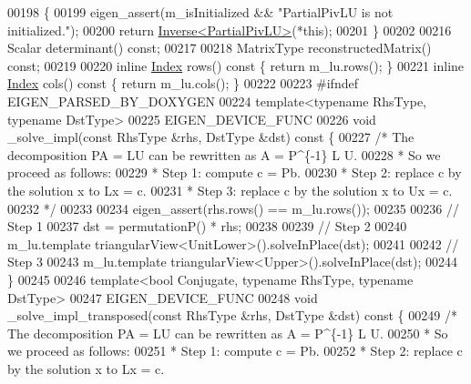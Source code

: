 \begin{DoxyCode}
00198 \textcolor{keyword}{    }\{
00199       eigen\_assert(m\_isInitialized && \textcolor{stringliteral}{"PartialPivLU is not initialized."});
00200       \textcolor{keywordflow}{return} \hyperlink{class_eigen_1_1_inverse}{Inverse<PartialPivLU>}(*this);
00201     \}
00202 
00216     Scalar determinant() \textcolor{keyword}{const};
00217 
00218     MatrixType reconstructedMatrix() \textcolor{keyword}{const};
00219 
00220     \textcolor{keyword}{inline} \hyperlink{group___core___module_a554f30542cc2316add4b1ea0a492ff02}{Index} rows()\textcolor{keyword}{ const }\{ \textcolor{keywordflow}{return} m\_lu.rows(); \}
00221     \textcolor{keyword}{inline} \hyperlink{group___core___module_a554f30542cc2316add4b1ea0a492ff02}{Index} cols()\textcolor{keyword}{ const }\{ \textcolor{keywordflow}{return} m\_lu.cols(); \}
00222 
00223 \textcolor{preprocessor}{    #ifndef EIGEN\_PARSED\_BY\_DOXYGEN}
00224     \textcolor{keyword}{template}<\textcolor{keyword}{typename} RhsType, \textcolor{keyword}{typename} DstType>
00225     EIGEN\_DEVICE\_FUNC
00226     \textcolor{keywordtype}{void} \_solve\_impl(\textcolor{keyword}{const} RhsType &rhs, DstType &dst)\textcolor{keyword}{ const }\{
00227      \textcolor{comment}{/* The decomposition PA = LU can be rewritten as A = P^\{-1\} L U.}
00228 \textcolor{comment}{      * So we proceed as follows:}
00229 \textcolor{comment}{      * Step 1: compute c = Pb.}
00230 \textcolor{comment}{      * Step 2: replace c by the solution x to Lx = c.}
00231 \textcolor{comment}{      * Step 3: replace c by the solution x to Ux = c.}
00232 \textcolor{comment}{      */}
00233 
00234       eigen\_assert(rhs.rows() == m\_lu.rows());
00235 
00236       \textcolor{comment}{// Step 1}
00237       dst = permutationP() * rhs;
00238 
00239       \textcolor{comment}{// Step 2}
00240       m\_lu.template triangularView<UnitLower>().solveInPlace(dst);
00241 
00242       \textcolor{comment}{// Step 3}
00243       m\_lu.template triangularView<Upper>().solveInPlace(dst);
00244     \}
00245 
00246     \textcolor{keyword}{template}<\textcolor{keywordtype}{bool} Conjugate, \textcolor{keyword}{typename} RhsType, \textcolor{keyword}{typename} DstType>
00247     EIGEN\_DEVICE\_FUNC
00248     \textcolor{keywordtype}{void} \_solve\_impl\_transposed(\textcolor{keyword}{const} RhsType &rhs, DstType &dst)\textcolor{keyword}{ const }\{
00249      \textcolor{comment}{/* The decomposition PA = LU can be rewritten as A = P^\{-1\} L U.}
00250 \textcolor{comment}{      * So we proceed as follows:}
00251 \textcolor{comment}{      * Step 1: compute c = Pb.}
00252 \textcolor{comment}{      * Step 2: replace c by the solution x to Lx = c.}

\end{DoxyCode}
